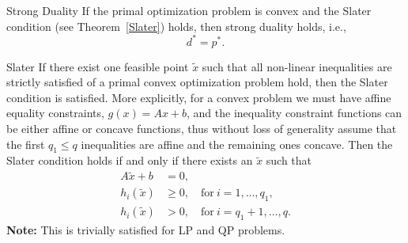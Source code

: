 \begin{theo}{Strong Duality}
    If the primal optimization problem is convex and the Slater condition (see Theorem~\ref{Slater}) holds, then strong duality holds, i\@.e\@.,
    \begin{equation*}
        d^* = p^*.
    \end{equation*}
    \vspace*{-0.5cm}
\end{theo}

\newpage

\begin{theo}{Slater}  
    \vspace{-0.1cm}  
    If there exist one feasible point $\tilde{x}$ such that all non-linear inequalities are strictly satisfied of a primal convex optimization problem hold, then the Slater condition is satisfied. More explicitly, for a convex problem we must have affine equality constraints, $g(x) = Ax + b$, and the inequality constraint functions can be either affine or concave functions, thus without loss of generality assume that the first $q_1 \leq q$ inequalities are affine and the remaining ones concave. Then the Slater condition holds if and only if there exists an $\tilde{x}$ such that
    \begin{align*}
        A\tilde{x} + b &= 0, \\
        h_i(\tilde{x}) &\geq 0, \quad \text{for} \ i = 1, \ldots, q_1, \\
        h_i(\tilde{x}) &> 0, \quad \text{for} \ i = q_1 + 1, \ldots, q. 
    \end{align*}
    \textbf{Note:} This is trivially satisfied for LP and QP problems.
\end{theo}

